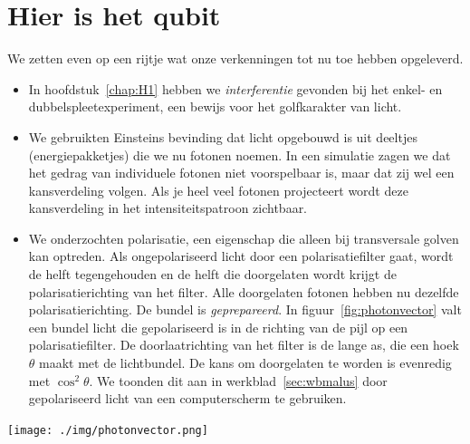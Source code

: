 \documentclass[../../main.tex]{subfiles}
\begin{document}
\section{Hier is het qubit}\label{sec:zoekqubit}

We zetten even op een rijtje wat onze verkenningen tot nu toe hebben opgeleverd.

\begin{itemize}
\item In hoofdstuk~\ref{chap:H1} hebben we \textit{interferentie} gevonden bij het enkel- en dubbelspleetexperiment, een bewijs voor het golfkarakter van licht.

\item We gebruikten Einsteins bevinding dat licht opgebouwd is uit deeltjes (energiepakketjes) die we nu fotonen noemen. In een simulatie zagen we dat het gedrag van individuele fotonen niet voorspelbaar is, maar dat zij wel een kansverdeling volgen. Als je heel veel fotonen projecteert wordt deze kansverdeling in het intensiteitspatroon zichtbaar.

\item We onderzochten polarisatie, een eigenschap die alleen bij transversale golven kan optreden. Als ongepolariseerd licht door een polarisatiefilter gaat, wordt de helft tegengehouden en de helft die doorgelaten wordt krijgt de polarisatierichting van het filter. Alle doorgelaten fotonen hebben nu dezelfde polarisatierichting. De bundel is \textit{geprepareerd}. In figuur~\ref{fig:photonvector} valt een bundel licht die gepolariseerd is in de richting van de pijl op een polarisatiefilter. De doorlaatrichting van het filter is de lange as, die een hoek $\theta$ maakt met de lichtbundel. De kans om doorgelaten te worden is evenredig met $\cos^2 \theta$. We toonden dit aan in werkblad~\ref{sec:wbmalus} door gepolariseerd licht van een computerscherm te gebruiken.
\end{itemize}


\begin{flushleft}
\begin{minipage}{.45\textwidth}
\texttt{[image: ./img/photonvector.png]}
\end{minipage}%
\hfill
\begin{minipage}{.5\textwidth}
\end{minipage}
\end{flushleft}
\end{document}
